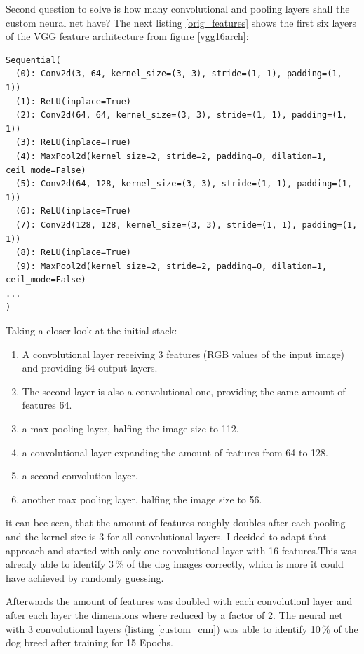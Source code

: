 \documentclass[paper=A4, DIV=calc, parskip=half]{scrartcl}
\begin{document}
Second question to solve is how many convolutional and pooling layers shall the
custom neural net have? The next listing \ref{orig_features} shows the first six
layers of the VGG feature architecture from figure \ref{vgg16arch}:

\begin{lstlisting}[caption=Original VGG16 Features, label=orig_features]
Sequential(
  (0): Conv2d(3, 64, kernel_size=(3, 3), stride=(1, 1), padding=(1, 1))
  (1): ReLU(inplace=True)
  (2): Conv2d(64, 64, kernel_size=(3, 3), stride=(1, 1), padding=(1, 1))
  (3): ReLU(inplace=True)
  (4): MaxPool2d(kernel_size=2, stride=2, padding=0, dilation=1, ceil_mode=False)
  (5): Conv2d(64, 128, kernel_size=(3, 3), stride=(1, 1), padding=(1, 1))
  (6): ReLU(inplace=True)
  (7): Conv2d(128, 128, kernel_size=(3, 3), stride=(1, 1), padding=(1, 1))
  (8): ReLU(inplace=True)
  (9): MaxPool2d(kernel_size=2, stride=2, padding=0, dilation=1, ceil_mode=False)
...
)
\end{lstlisting}

Taking a closer look at the initial stack:

\begin{enumerate}
\item A convolutional layer receiving 3 features (RGB values of the input image)
and providing 64 output layers.
\item The second layer is also a convolutional one, providing the same amount of
features 64.
\item a max pooling layer, halfing the image size to 112.
\item a convolutional layer expanding the amount of features from 64 to 128.
\item a second convolution layer.
\item another max pooling layer, halfing the image size to 56.
\end{enumerate}

it can bee seen, that the amount of features roughly doubles after each pooling
and the kernel size is 3 for all convolutional layers. I decided to adapt that
approach and started with only one convolutional layer with 16 features.This was
already able to identify 3\,\% of the dog images correctly, which is more it
could have achieved by randomly guessing. 

Afterwards the amount of features was doubled with each convolutionl layer and
after each layer the dimensions where reduced by a factor of 2. The neural net
with 3 convolutional layers (listing \ref{custom_cnn}) was able to identify
10\,\% of the dog breed after training for 15 Epochs.
\end{document}
